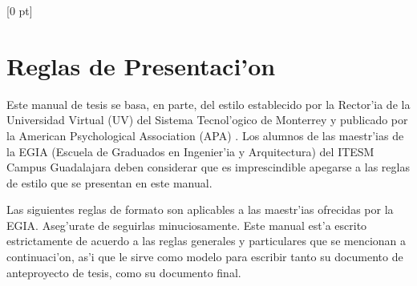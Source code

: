 \titlespacing{\chapter}{0 pt}{30 pt}{50 pt}[0 pt]
\titleformat{\section}{\Large\bfseries}{\thesection}{0 pt}{\hspace{30 pt}}
\titleformat{\subsection}{\large\bfseries}{\thesubsection}{0 pt}{\hspace{30 pt}}
\pagestyle{fancy}
\fancyhead[LO,LE]{\footnotesize\emph{\leftmark}}
\fancyhead[RO,RE]{\thepage}
\fancyfoot[CO,CE]{}

\chapter{Reglas de Presentaci'on} %

\normalsize
\noindent
Este manual de tesis se basa, en parte, del estilo establecido por la Rector'ia de la Universidad Virtual (UV) del Sistema Tecnol'ogico de Monterrey \cite{Demo:manualUV} y publicado por la American Psychological Association (APA) \cite{Demo:APA,Demo:manualAPA}. Los alumnos de las maestr'ias de la EGIA (Escuela de Graduados en Ingenier'ia y Arquitectura) del ITESM Campus Guadalajara deben considerar que es imprescindible apegarse a las reglas de estilo que se presentan en este manual.

Las siguientes reglas de formato son aplicables a las maestr'ias ofrecidas por la EGIA. Aseg'urate de seguirlas minuciosamente. Este manual est'a escrito estrictamente de acuerdo a las reglas generales y particulares que se mencionan a continuaci'on, as'i que le sirve como modelo para escribir tanto su documento de anteproyecto de tesis, como su documento final.

